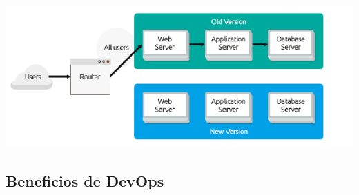 \documentclass{article}
\begin{document}
\begin{center}
  \includegraphics[scale=0.5]{44}
\end{center}

\pagebreak

\subsection{Beneficios de DevOps}
\end{document}
